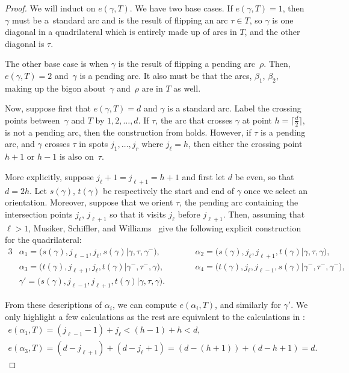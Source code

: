 \begin{proof}We will induct on $e(\gamma, T)$. We have two base cases. If $e(\gamma, T) = 1$, then $\gamma$ must be a~standard arc and is the result of flipping an arc $\tau \in T$, so $\gamma$ is one diagonal in a quadrilateral which is entirely made up of arcs in $T$, and the other diagonal is $\tau$.

The other base case is when $\gamma$ is the result of flipping a pending arc~$\rho$. Then, $e(\gamma,T) = 2$ and~$\gamma$ is a pending arc. It also must be that the arcs, $\beta_1$, $\beta_2$, making up the bigon about~$\gamma$ and~$\rho$ are in $T$ as well.

 Now, suppose first that $e(\gamma, T) = d$ and $\gamma$ is a standard arc. Label the crossing points between~$\gamma$ and $T$ by $1,2, \ldots, d$. If $\tau$, the arc that crosses $\gamma$ at point $h = \lceil \frac{d}{2} \rceil$, is not a pending arc, then the construction from \cite[Lemma~9.1]{MSW} holds. However, if $\tau$ is a pending arc, and $\gamma$ crosses $\tau$ in spots $j_1,\ldots, j_r$ where $j_\ell = h$, then either the crossing point $h+1$ or $h-1$ is also on~$\tau$.

More explicitly, suppose $j_{\ell} + 1 = j_{\ell + 1} = h+1$ and first let $d$ be even, so that $d = 2h$. Let $s(\gamma)$, $t(\gamma)$ be respectively the start and end of $\gamma$ once we select an orientation. Moreover, suppose that we orient $\tau$, the pending arc containing the intersection points $j_\ell$, $j_{\ell + 1}$ so that it visits $j_\ell$ before $j_{\ell+1}$. Then, assuming that $\ell > 1$, Musiker, Schiffler, and Williams~\cite{MSW} give the following explicit construction for the quadrilateral:
\begin{alignat*}{3}
 & \alpha_1 = \big(s(\gamma), j_{\ell - 1}, j_\ell, s(\gamma) \vert \gamma, \tau, \gamma^-\big), \qquad &&
 \alpha_2 = \big(s(\gamma), j_\ell, j_{\ell + 1}, t(\gamma) \vert \gamma, \tau, \gamma\big), & \\
 & \alpha_3 = \big(t(\gamma), j_{\ell+1}, j_\ell, t(\gamma) \vert \gamma^-, \tau^-, \gamma\big), \qquad &&
 \alpha_4 = \big(t(\gamma), j_\ell, j_{\ell - 1}, s(\gamma) \vert \gamma^-, \tau^-, \gamma^-\big), & \\
 &\gamma' = \big(s(\gamma), j_{\ell - 1}, j_{\ell + 1}, t(\gamma) \vert \gamma, \tau, \gamma\big).\qquad &&&
\end{alignat*}

From these descriptions of $\alpha_i$, we can compute $e(\alpha_i,T)$, and similarly for $\gamma'$. We only highlight a few calculations as the rest are equivalent to the calculations in \cite{MSW}:
\begin{gather*}
 e(\alpha_1,T)= (j_{\ell-1} - 1) + j_\ell < (h-1) + h < d ,\\
 e(\alpha_3,T)= (d - j_{\ell + 1}) + (d - j_{\ell} + 1) = (d - (h+1)) + (d - h + 1) = d.
\end{gather*}


\end{proof}

